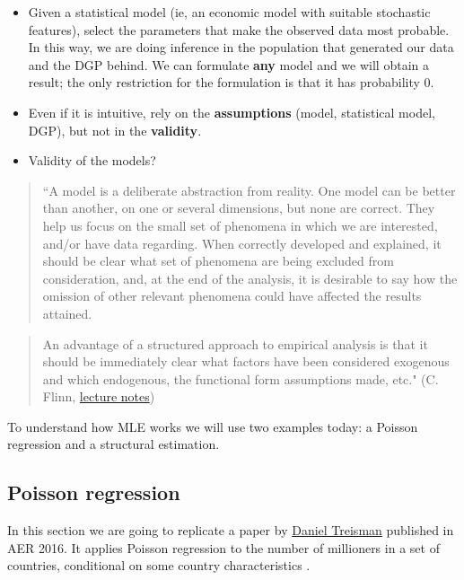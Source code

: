 \documentclass[]{book}
\begin{document}
\begin{itemize}
\item
  Given a statistical model (ie, an economic model with suitable
  stochastic features), select the parameters that make the observed
  data most probable. In this way, we are doing inference in the
  population that generated our data and the DGP behind. We can
  formulate \textbf{any} model and we will obtain a result; the only
  restriction for the formulation is that it has probability 0.
\item
  Even if it is intuitive, rely on the \textbf{assumptions} (model,
  statistical model, DGP), but not in the \textbf{validity}.
\item
  Validity of the models?
\end{itemize}

\begin{quote}
``A model is a deliberate abstraction from reality. One model can be
better than another, on one or several dimensions, but none are correct.
They help us focus on the small set of phenomena in which we are
interested, and/or have data regarding. When correctly developed and
explained, it should be clear what set of phenomena are being excluded
from consideration, and, at the end of the analysis, it is desirable to
say how the omission of other relevant phenomena could have affected the
results attained.
\end{quote}

\begin{quote}
An advantage of a structured approach to empirical analysis is that it
should be immediately clear what factors have been considered exogenous
and which endogenous, the functional form assumptions made, etc." (C.
Flinn,
\href{http://www.econ.nyu.edu/user/flinnc/courses/CCA-RGSE-2019/search_estimation_notes.pdf}{lecture
notes})
\end{quote}

To understand how MLE works we will use two examples today: a Poisson
regression and a structural estimation.

\subsection{Poisson regression}\label{poisson-regression}

In this section we are going to replicate a paper by
\href{https://www.danieltreisman.org/}{Daniel Treisman} published in AER
2016. It applies Poisson regression to the number of millioners in a set
of countries, conditional on some country characteristics
\citep{treisman2016russia}.
\end{document}
